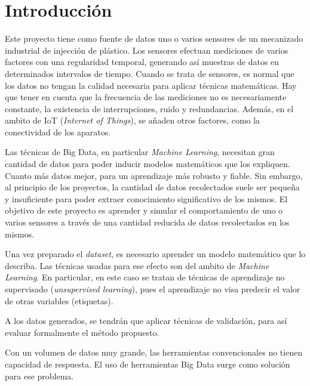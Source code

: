 \documentclass[11pt,spanish,listoffigures,listoftables]{tfgetsinf}
\begin{document}
\chapter{Introducci\'on}

Este proyecto tiene como fuente de datos uno o varios sensores de un mecanizado industrial de injección de plástico. Los sensores efectuan mediciones de varios factores con una regularidad temporal, generando así muestras de datos en determinados intervalos de tiempo. Cuando se trata de sensores, es normal que los datos no tengan la calidad necesaria para aplicar técnicas matemáticas. Hay que tener en cuenta que la frecuencia de las mediciones no es necesariamente constante, la existencia de interrupciones, ruido y redundancias. Además, en el ambito de IoT ({\em Internet of Things}), se añaden otros factores, como la conectividad de los aparatos. 

Las técnicas de Big Data, en particular {\em Machine Learning}, necesitan gran cantidad de datos para poder inducir modelos matemáticos que los expliquen. Cuanto más datos mejor, para un aprendizaje más robusto y fiable. Sin embargo, al principio de los proyectos, la cantidad de datos recolectados suele ser pequeña y insuficiente para poder extraer conocimiento significativo de los mismos. El objetivo de este proyecto es aprender y simular el comportamiento de uno o varios sensores a través de una cantidad reducida de datos recolectados en los mismos. 

Una vez preparado el {\em dataset}, es necesario aprender un modelo matemático que lo describa. Las técnicas usadas para ese efecto son del ambito de {\em Machine Learning}. En particular, en este caso se tratan de técnicas de aprendizaje no supervisado ({\em unsupervised learning}), pues el aprendizaje no visa predecir el valor de otras variables (etiquetas). 

A los datos generados, se tendrán que aplicar técnicas de validación, para así evaluar formalmente el método propuesto.

Con un volumen de datos muy grande, las herramientas convencionales no tienen capacidad de respuesta. El uso de herramientas Big Data surge como solución para ese problema.
\end{document}
